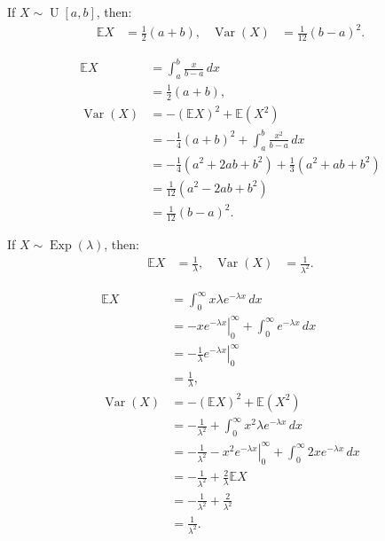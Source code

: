 \documentclass{huhtakm-template-book-v2}
\newcommand{\expect}{\mathbb{E}}
\DeclareMathOperator{\U}{U}
\DeclareMathOperator{\Exp}{Exp}
\DeclareMathOperator{\Var}{Var}
\begin{document}
    \begin{thm}
        If $X \sim \U[a, b]$, then:
        \begin{align*}
            \expect{X} &= \frac{1}{2}(a+b), & \Var(X) &= \frac{1}{12}(b-a)^{2}.
        \end{align*}
    \end{thm}
    \begin{proofing}
        \begin{align*}
            \expect{X} &= \int_{a}^{b}\frac{x}{b-a}\,dx\\
            &= \frac{1}{2}(a+b),\\
            \Var(X) &= -(\expect{X})^{2} + \expect(X^{2})\\
            &= -\frac{1}{4}(a+b)^{2} + \int_{a}^{b}\frac{x^{2}}{b-a}\,dx\\
            &= -\frac{1}{4}(a^{2} + 2ab + b^{2}) + \frac{1}{3}(a^{2} + ab + b^{2})\\
            &= \frac{1}{12}(a^{2} - 2ab + b^{2})\\
            &= \frac{1}{12}(b-a)^{2}.
        \end{align*}
    \end{proofing}
    \begin{thm}
        If $X \sim \Exp(\lambda)$, then:
        \begin{align*}
            \expect{X} &= \frac{1}{\lambda}, & \Var(X) &= \frac{1}{\lambda^{2}}.
        \end{align*}
    \end{thm}
    \begin{proofing}
        \begin{align*}
            \expect{X} &= \int_{0}^{\infty}x\lambda e^{-\lambda x}\,dx\\
            &= \left.-xe^{-\lambda x}\right|_{0}^{\infty} + \int_{0}^{\infty}e^{-\lambda x}\,dx\\
            &= \left.-\frac{1}{\lambda}e^{-\lambda x}\right|_{0}^{\infty}\\
            &= \frac{1}{\lambda},\\
            \Var(X) &= -(\expect{X})^{2} + \expect(X^{2})\\
            &= -\frac{1}{\lambda^{2}} + \int_{0}^{\infty}x^{2}\lambda e^{-\lambda x}\,dx\\
            &= -\frac{1}{\lambda^{2}} - \left.x^{2}e^{-\lambda x}\right|_{0}^{\infty} + \int_{0}^{\infty}2xe^{-\lambda x}\,dx\\
            &= -\frac{1}{\lambda^{2}} + \frac{2}{\lambda}\expect{X}\\
            &= -\frac{1}{\lambda^{2}} + \frac{2}{\lambda^{2}}\\
            &= \frac{1}{\lambda^{2}}.
        \end{align*}
    \end{proofing}
    \newpage
\end{document}
